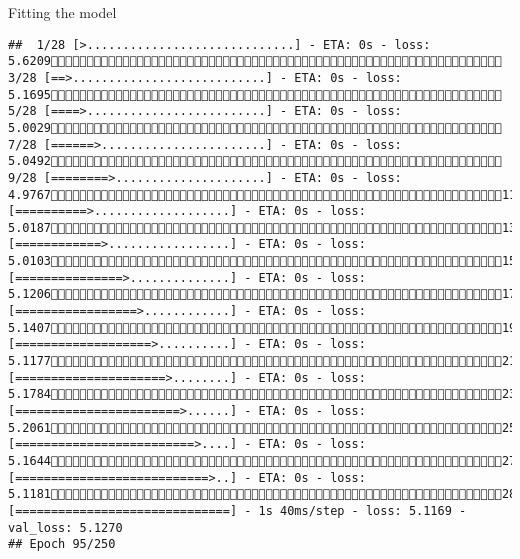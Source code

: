 \documentclass[
  ignorenonframetext,
]{beamer}
\begin{document}
\begin{frame}[fragile]{Fitting the model}
\begin{verbatim}
##  1/28 [>.............................] - ETA: 0s - loss: 5.6209 3/28 [==>...........................] - ETA: 0s - loss: 5.1695 5/28 [====>.........................] - ETA: 0s - loss: 5.0029 7/28 [======>.......................] - ETA: 0s - loss: 5.0492 9/28 [========>.....................] - ETA: 0s - loss: 4.976711/28 [==========>...................] - ETA: 0s - loss: 5.018713/28 [============>.................] - ETA: 0s - loss: 5.010315/28 [===============>..............] - ETA: 0s - loss: 5.120617/28 [=================>............] - ETA: 0s - loss: 5.140719/28 [===================>..........] - ETA: 0s - loss: 5.117721/28 [=====================>........] - ETA: 0s - loss: 5.178423/28 [=======================>......] - ETA: 0s - loss: 5.206125/28 [=========================>....] - ETA: 0s - loss: 5.164427/28 [===========================>..] - ETA: 0s - loss: 5.118128/28 [==============================] - 1s 40ms/step - loss: 5.1169 - val_loss: 5.1270
## Epoch 95/250

\end{verbatim}
\end{frame}
\end{document}
